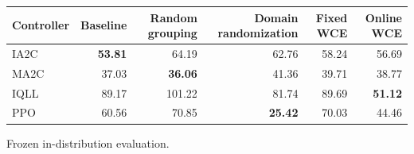 \begin{tabular}{lrrrrr}
\hline
Controller & Baseline & Random grouping & Domain randomization & Fixed WCE & Online WCE \\
\hline
IA2C & \textbf{53.81} & 64.19 & 62.76 & 58.24 & 56.69 \\
MA2C & 37.03 & \textbf{36.06} & 41.36 & 39.71 & 38.77 \\
IQLL & 89.17 & 101.22 & 81.74 & 89.69 & \textbf{51.12} \\
PPO & 60.56 & 70.85 & \textbf{25.42} & 70.03 & 44.46 \\
\hline
\end{tabular}
Frozen in-distribution evaluation.

